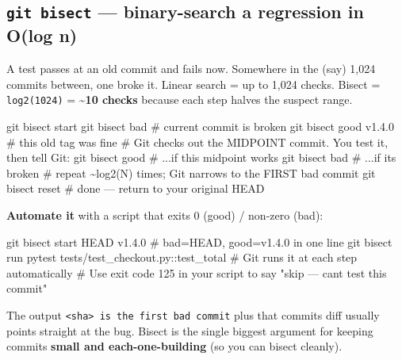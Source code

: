 \documentclass[11pt]{article}
\newenvironment{Shaded}{\begin{snugshade}}{\end{snugshade}}
\newcommand{\CommentTok}[1]{\textcolor[rgb]{0.48,0.49,0.49}{#1}}
\newcommand{\FunctionTok}[1]{\textcolor[rgb]{0.56,0.27,0.68}{#1}}
\newcommand{\NormalTok}[1]{\textcolor[rgb]{0.81,0.81,0.76}{#1}}
\begin{document}
\subsection{\texorpdfstring{\texttt{git\ bisect} --- binary-search a regression in O(log n)}{git bisect --- binary-search a regression in O(log n)}}\label{git-bisect--binary-search-a-regression-in-olog-n}

A test passes at an old commit and fails now. Somewhere in the (say) 1,024 commits between, one broke it. Linear search = up to 1,024 checks. Bisect = \texttt{log2(1024)} = \textbf{\textasciitilde10 checks} because each step halves the suspect range.


\begin{Shaded}
\begin{Highlighting}[]
\FunctionTok{git}\NormalTok{ bisect start}
\FunctionTok{git}\NormalTok{ bisect bad                 }\CommentTok{\# current commit is broken}
\FunctionTok{git}\NormalTok{ bisect good v1.4.0         }\CommentTok{\# this old tag was fine}
\CommentTok{\# Git checks out the MIDPOINT commit. You test it, then tell Git:}
\FunctionTok{git}\NormalTok{ bisect good                }\CommentTok{\#   ...if this midpoint works}
\FunctionTok{git}\NormalTok{ bisect bad                 }\CommentTok{\#   ...if it\textquotesingle{}s broken}
\CommentTok{\# repeat \textasciitilde{}log2(N) times; Git narrows to the FIRST bad commit}
\FunctionTok{git}\NormalTok{ bisect reset               }\CommentTok{\# done — return to your original HEAD}
\end{Highlighting}
\end{Shaded}

\textbf{Automate it} with a script that exits 0 (good) / non-zero (bad):


\begin{Shaded}
\begin{Highlighting}[]
\FunctionTok{git}\NormalTok{ bisect start HEAD v1.4.0   }\CommentTok{\# bad=HEAD, good=v1.4.0 in one line}
\FunctionTok{git}\NormalTok{ bisect run pytest tests/test\_checkout.py::test\_total   }\CommentTok{\# Git runs it at each step automatically}
\CommentTok{\# Use exit code 125 in your script to say "skip — can\textquotesingle{}t test this commit"}
\end{Highlighting}
\end{Shaded}

The output \texttt{\textless{}sha\textgreater{}\ is\ the\ first\ bad\ commit} plus that commit\textquotesingle s diff usually points straight at the bug. Bisect is the single biggest argument for keeping commits \textbf{small and each-one-building} (so you can bisect cleanly).
\end{document}
